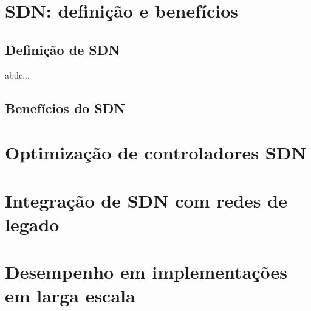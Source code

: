 \documentclass{llncs}
\begin{document}
\section{SDN: definição e benefícios}

\subsection{Definição de SDN}
abdc...
\subsection{Benefícios do SDN}
\section{Optimização de controladores SDN}
\section{Integração de SDN com redes de legado}
\section{Desempenho em implementações em larga escala}





\end{document}
